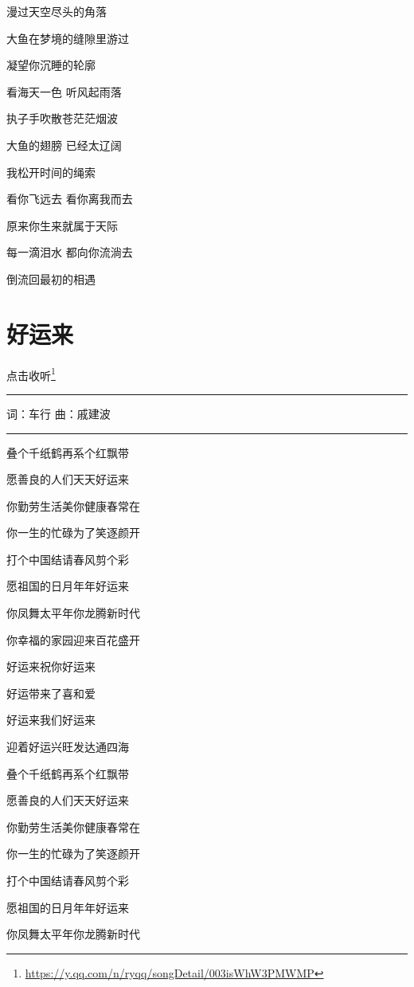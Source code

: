 \documentclass[]{ctexbook}
\renewcommand{\href}[2]{#2\footnote{\url{#1}}}
\begin{document}
漫过天空尽头的角落

大鱼在梦境的缝隙里游过

凝望你沉睡的轮廓

看海天一色 听风起雨落

执子手吹散苍茫茫烟波

大鱼的翅膀 已经太辽阔

我松开时间的绳索

看你飞远去 看你离我而去

原来你生来就属于天际

每一滴泪水 都向你流淌去

倒流回最初的相遇

\section*{好运来}\label{good-luck-comes}


\href{https://y.qq.com/n/ryqq/songDetail/003isWhW3PMWMP}{点击收听}

\begin{center}\rule{0.5\linewidth}{0.5pt}\end{center}

词：车行
曲：戚建波

\begin{center}\rule{0.5\linewidth}{0.5pt}\end{center}

叠个千纸鹤再系个红飘带

愿善良的人们天天好运来

你勤劳生活美你健康春常在

你一生的忙碌为了笑逐颜开

打个中国结请春风剪个彩

愿祖国的日月年年好运来

你凤舞太平年你龙腾新时代

你幸福的家园迎来百花盛开

好运来祝你好运来

好运带来了喜和爱

好运来我们好运来

迎着好运兴旺发达通四海

叠个千纸鹤再系个红飘带

愿善良的人们天天好运来

你勤劳生活美你健康春常在

你一生的忙碌为了笑逐颜开

打个中国结请春风剪个彩

愿祖国的日月年年好运来

你凤舞太平年你龙腾新时代
\end{document}
